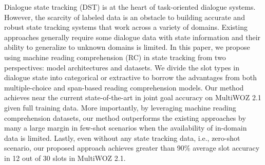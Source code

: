 Dialogue state tracking (DST) is at the heart of task-oriented dialogue systems. However, the scarcity of labeled data is an obstacle to building accurate and robust state tracking systems that work across a variety of domains. Existing approaches generally require some dialogue data with state information and their ability to generalize to unknown domains is limited. In this paper, we propose using machine reading comprehension (RC) in state tracking from two perspectives: model architectures and datasets. We divide the slot types in dialogue state into categorical or extractive to borrow the advantages from both multiple-choice and span-based reading comprehension models. Our method achieves near the current state-of-the-art in joint goal accuracy on MultiWOZ 2.1 given full training data. More importantly, by leveraging machine reading comprehension datasets, our method outperforms the existing approaches by many a large margin in few-shot scenarios when the availability of in-domain data is limited. Lastly, even without any state tracking data, i.e., zero-shot scenario, our proposed approach achieves greater than 90\% average slot accuracy in 12 out of 30 slots in MultiWOZ 2.1.
